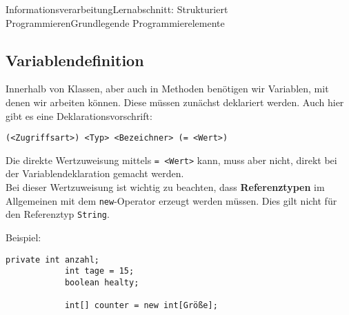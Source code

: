 \documentclass[11pt,oneside,openany,headings=optiontotoc,11pt,numbers=noenddot]{article}
\begin{document}
\begin{worksheet}{Informationsverarbeitung}{Lernabschnitt: Strukturiert Programmieren}{Grundlegende Programmierelemente}
		\subsection{Variablendefinition}
		Innerhalb von Klassen, aber auch in Methoden benötigen wir Variablen, mit denen wir arbeiten können. Diese müssen zunächst deklariert werden. Auch hier gibt es eine Deklarationsvorschrift:
		\begin{lstlisting}[style=Python]
			(<Zugriffsart>) <Typ> <Bezeichner> (= <Wert>)
		\end{lstlisting}
		Die direkte Wertzuweisung mittels \lstinline[style=Python]{= <Wert>} kann, muss aber nicht, direkt bei der Variablendeklaration gemacht werden.\\
		Bei dieser \grq{}Wertzuweisung\grq{} ist wichtig zu beachten, dass \textbf{Referenztypen} im Allgemeinen mit dem \lstinline[style=Python]{new}-Operator erzeugt werden müssen. Dies gilt nicht für den Referenztyp \lstinline[style=Python]{String}.\\
		\par\noindent
		Beispiel:
		\begin{lstlisting}[style=Python,frame=single]
			private int anzahl;
			int tage = 15;
			boolean healty;
			
			int[] counter = new int[Größe];
		\end{lstlisting}

\end{worksheet}
\end{document}
